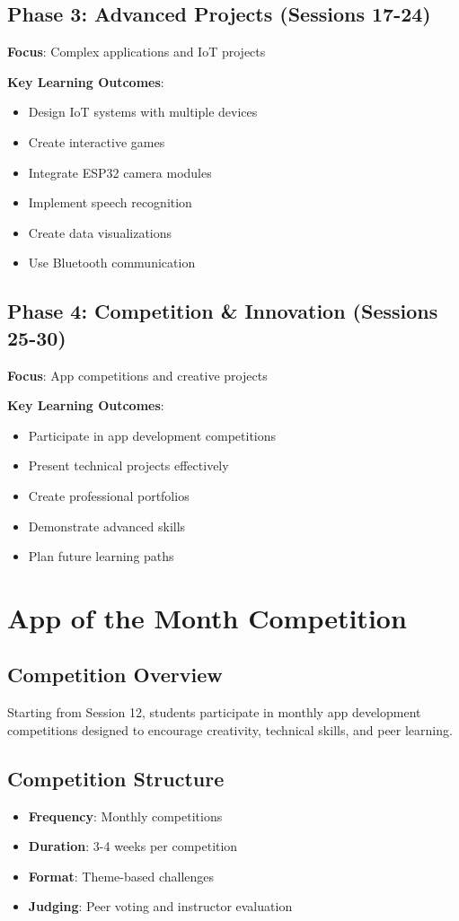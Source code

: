 \documentclass[12pt,a4paper]{article}
\begin{document}
\subsection{Phase 3: Advanced Projects (Sessions 17-24)}
\textbf{Focus}: Complex applications and IoT projects

\textbf{Key Learning Outcomes}:
\begin{itemize}
    \item Design IoT systems with multiple devices
    \item Create interactive games
    \item Integrate ESP32 camera modules
    \item Implement speech recognition
    \item Create data visualizations
    \item Use Bluetooth communication
\end{itemize}

\subsection{Phase 4: Competition \& Innovation (Sessions 25-30)}
\textbf{Focus}: App competitions and creative projects

\textbf{Key Learning Outcomes}:
\begin{itemize}
    \item Participate in app development competitions
    \item Present technical projects effectively
    \item Create professional portfolios
    \item Demonstrate advanced skills
    \item Plan future learning paths
\end{itemize}

\section{App of the Month Competition}

\subsection{Competition Overview}
Starting from Session 12, students participate in monthly app development competitions designed to encourage creativity, technical skills, and peer learning.

\subsection{Competition Structure}
\begin{itemize}
    \item \textbf{Frequency}: Monthly competitions
    \item \textbf{Duration}: 3-4 weeks per competition
    \item \textbf{Format}: Theme-based challenges
    \item \textbf{Judging}: Peer voting and instructor evaluation
\end{itemize}
\end{document}
